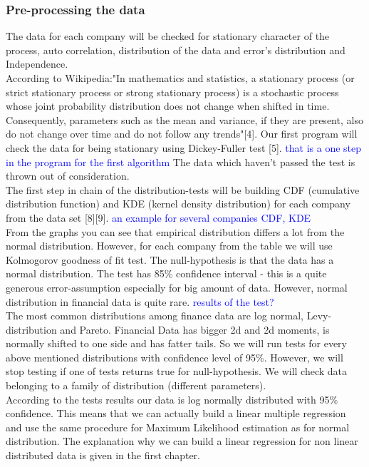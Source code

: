 \documentclass[12pt, a4paper]{article}
\begin{document}
\subsubsection{Pre-processing the data}
The data for each company will be checked for stationary character of the process, auto correlation, distribution of the data and error's distribution and Independence.\\
According to Wikipedia:"In mathematics and statistics, a stationary process (or strict stationary process or strong stationary process) is a stochastic process whose joint probability distribution does not change when shifted in time. Consequently, parameters such as the mean and variance, if they are present, also do not change over time and do not follow any trends"[4]. Our first program will check the data for being stationary using Dickey-Fuller test [5]. \textcolor{blue}{that is a one step in the program for the first algorithm} The data which haven't passed the test is thrown out of consideration.\\
The first step in chain of the distribution-tests will be building CDF (cumulative distribution function) and KDE (kernel density distribution) for each company from the data set [8][9]. \textcolor{blue}{an example for several companies CDF, KDE}\\
From the graphs you can see that empirical distribution differs a lot from the normal distribution. However, for each company from the table we will use Kolmogorov goodness of fit test. The null-hypothesis is that the data has a normal distribution. The test has 85\% confidence interval - this is a quite generous error-assumption especially for big amount of data. However, normal distribution in financial data is quite rare. \textcolor{blue}{results of the test?}\\
The most common distributions among finance data are log normal, Levy-distribution and Pareto. Financial Data has bigger 2d and 2d moments, is normally shifted to one side and has fatter tails. So we will run tests for every above mentioned distributions with confidence level of 95\%. However, we will stop testing if one of tests returns true for null-hypothesis. We will check data belonging to a family of distribution (different parameters).\\
According to the tests results our data is log normally distributed with 95\% confidence. This means that we can actually build a linear multiple regression and use the same procedure for Maximum Likelihood estimation as for normal distribution. The explanation why we can build a linear regression for non linear distributed data is given in the first chapter. 
\end{document}
